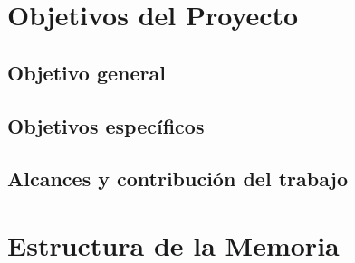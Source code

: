 \section{Objetivos del Proyecto}

\subsection{Objetivo general}

\subsection{Objetivos específicos}

\subsection{Alcances y contribución del trabajo}


\section{Estructura de la Memoria}
